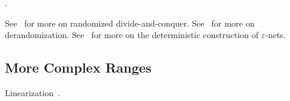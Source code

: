 .

See~\cite[Section~40.1]{CMR04} for more on randomized divide-and-conquer.
See~\cite[Section~40.6]{CMR04} for more on derandomization.
See~\cite[Section~40.7]{CMR04} for more on the deterministic construction of
\(\varepsilon\)-nets.

\subsection{More Complex Ranges}

Linearization~\cite{YY85,AM94}.

